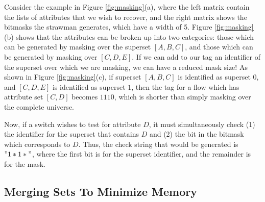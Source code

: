 Consider the example in Figure \ref{fig:masking}(a), where the left matrix
contain the lists of attributes that we wish to recover, and the right matrix
shows the bitmasks the strawman generates, which have a width of 5. Figure
\ref{fig:masking}(b) shows that the attributes can be broken up into two
categories: those which can be generated by masking over the superset $[A,B,C]$,
and those which can be generated by masking over $[C,D,E]$. If we can add to our
tag an identifier of the superset over which we are masking, we can have a
reduced mask size! As shown in Figure \ref{fig:masking}(c), if superset
$[A,B,C]$ is identified as superset $0$, and $[C,D,E]$ is identified as superset
$1$, then the tag for a flow which has attribute set $[C,D]$ becomes
$1110$, which is shorter than simply masking over the complete universe.

Now, if a switch wishes to test for attribute $D$, it must simultaneously check
(1) the identifier for the superset that contains $D$ and (2) the bit in the
bitmask which corresponds to $D$. Thus, the check string that would be generated is $"1*1*"$, where the first bit is for
the superset identifier, and the remainder is for the mask.



\subsection{Merging Sets To Minimize Memory}
\label{ssec:merge}




